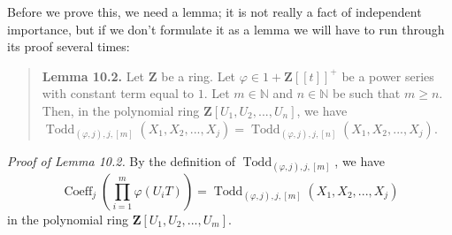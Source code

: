 \documentclass[numbers=enddot,12pt,final,onecolumn,notitlepage]{scrartcl}%
\begin{document}
Before we prove this, we need a lemma; it is not really a fact of independent
importance, but if we don't formulate it as a lemma we will have to run
through its proof several times:

\begin{quote}
\textbf{Lemma 10.2.} Let $\mathbf{Z}$ be a ring. Let $\varphi\in
1+\mathbf{Z}\left[  \left[  t\right]  \right]  ^{+}$ be a power series with
constant term equal to $1$. Let $m\in\mathbb{N}$ and $n\in\mathbb{N}$ be such
that $m\geq n$. Then, in the polynomial ring $\mathbf{Z}\left[  U_{1}%
,U_{2},...,U_{n}\right]  $, we have $\operatorname*{Todd}\nolimits_{\left(
\varphi,j\right)  ,j,\left[  m\right]  }\left(  X_{1},X_{2},...,X_{j}\right)
=\operatorname*{Todd}\nolimits_{\left(  \varphi,j\right)  ,j,\left[  n\right]
}\left(  X_{1},X_{2},...,X_{j}\right)  $.
\end{quote}

\textit{Proof of Lemma 10.2.} By the definition of $\operatorname*{Todd}%
\nolimits_{\left(  \varphi,j\right)  ,j,\left[  m\right]  }$, we have%
\begin{equation}
\operatorname*{Coeff}\nolimits_{j}\left(  \prod\limits_{i=1}^{m}\varphi\left(
U_{i}T\right)  \right)  =\operatorname*{Todd}\nolimits_{\left(  \varphi
,j\right)  ,j,\left[  m\right]  }\left(  X_{1},X_{2},...,X_{j}\right)
\label{10.1.pf.1}%
\end{equation}
in the polynomial ring $\mathbf{Z}\left[  U_{1},U_{2},...,U_{m}\right]  $.
\end{document}
